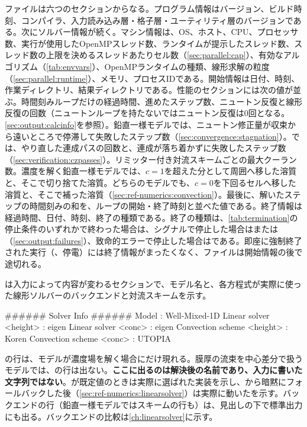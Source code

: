 ファイルは六つのセクションからなる。プログラム情報はバージョン、ビルド時刻、コンパイラ、入力読み込み層・格子層・ユーティリティ層のバージョンである。次にソルバー情報が続く。マシン情報は、OS、ホスト、CPU、プロセッサ数、実行が使用したOpenMPスレッド数、ランタイムが提示したスレッド数、スレッド数の上限を決めるスレッドあたりセル数（\cref{sec:parallel:cap}）、有効なアルゴリズム（\cref{tab:envvars}）、OpenMPランタイムの種類、線形求解の粒度（\cref{sec:parallel:runtime}）、メモリ、プロセスIDである。開始情報は日付、時刻、作業ディレクトリ、結果ディレクトリである。性能のセクションには次の値が並ぶ。時間刻みループだけの経過時間、進めたステップ数、ニュートン反復と線形反復の回数（ニュートンループを持たないではニュートン反復は0回となる。\cref{sec:output:calcinfo}を参照）。鉛直一様モデルでは、ニュートン修正量が収束から遠いところで停滞して失敗したステップ数（\cref{sec:convergence:stagnation}）。では、やり直した連成パスの回数と、連成が落ち着かずに失敗したステップ数（\cref{sec:verification:czpasses}）。リミッター付き対流スキームごとの最大クーラン数。濃度を解く鉛直一様モデルでは、$c = 1$を超えた分として周囲へ移した溶質と、そこで切り捨てた溶質。どちらのモデルでも、$c = 0$を下回るセルへ移した溶質と、そこで補った溶質（\cref{sec:ref-numerics:convection}）。最後に、解いたステップの時間刻みの和を、ループの開始・終了時刻と並べた値である。終了情報は経過時間、日付、時刻、終了の種類である。終了の種類は、\cref{tab:termination}の停止条件のいずれかで終わった場合は、シグナルで停止した場合はまたは（\cref{sec:output:failures}）、致命的エラーで停止した場合はである。即座に強制終了された実行（、停電）には終了情報がまったくなく、ファイルは開始情報の後で途切れる。

は入力によって内容が変わるセクションで、モデル名と、各方程式が実際に使った線形ソルバーのバックエンドと対流スキームを示す。

\begin{plain}
###### Solver Info ######
Model :                      Well-Mixed-1D
Linear solver <height> :     eigen
Linear solver <conc> :       eigen
Convection scheme <height> : Koren
Convection scheme <conc> :   UTOPIA
\end{plain}

の行は、モデルが濃度場を解く場合にだけ現れる。膜厚の流束を中心差分で扱うモデルでは、の行は出ない。\textbf{ここに出るのは解決後の名前であり、入力に書いた文字列ではない}。が既定値のときは実際に選ばれた実装を示し、から暗黙にフォールバックした後（\cref{sec:ref-numerics:linearsolver}）は実際に動いたを示す。バックエンドの行（鉛直一様モデルではスキームの行も）は、見出しの下で標準出力にも出る。バックエンドの比較は\cref{ch:linearsolver}に示す。

